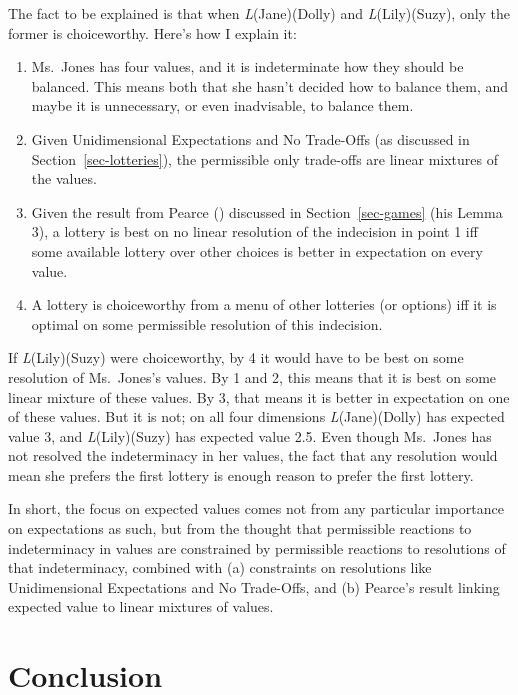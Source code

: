 \documentclass[
  11pt,
  letterpaper,
  DIV=11,
  numbers=noendperiod,
  twoside]{scrartcl}
\providecommand{\tightlist}{%
  \setlength{\itemsep}{0pt}\setlength{\parskip}{0pt}}
\begin{document}
The fact to be explained is that when \emph{L}(Jane)(Dolly) and
\emph{L}(Lily)(Suzy), only the former is choiceworthy. Here's how I
explain it:

\begin{enumerate}
\def\labelenumi{\arabic{enumi}.}
\tightlist
\item
  Ms.~Jones has four values, and it is indeterminate how they should be
  balanced. This means both that she hasn't decided how to balance them,
  and maybe it is unnecessary, or even inadvisable, to balance them.
\item
  Given Unidimensional Expectations and No Trade-Offs (as discussed in
  Section~\ref{sec-lotteries}), the permissible only trade-offs are
  linear mixtures of the values.
\item
  Given the result from Pearce ()
  discussed in Section~\ref{sec-games} (his Lemma 3), a lottery is best
  on no linear resolution of the indecision in point 1 iff some
  available lottery over other choices is better in expectation on every
  value.
\item
  A lottery is choiceworthy from a menu of other lotteries (or options)
  iff it is optimal on some permissible resolution of this indecision.
\end{enumerate}

If \emph{L}(Lily)(Suzy) were choiceworthy, by 4 it would have to be best
on some resolution of Ms.~Jones's values. By 1 and 2, this means that it
is best on some linear mixture of these values. By 3, that means it is
better in expectation on one of these values. But it is not; on all four
dimensions \emph{L}(Jane)(Dolly) has expected value 3, and
\emph{L}(Lily)(Suzy) has expected value 2.5. Even though Ms.~Jones has
not resolved the indeterminacy in her values, the fact that any
resolution would mean she prefers the first lottery is enough reason to
prefer the first lottery.

In short, the focus on expected values comes not from any particular
importance on expectations as such, but from the thought that
permissible reactions to indeterminacy in values are constrained by
permissible reactions to resolutions of that indeterminacy, combined
with (a) constraints on resolutions like Unidimensional Expectations and
No Trade-Offs, and (b) Pearce's result linking expected value to linear
mixtures of values.

\section{Conclusion}\label{sec-conclusion}
\end{document}
